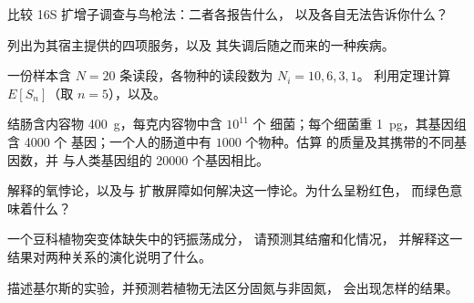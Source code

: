 \begin{exercise}[$\star$]\label{exo:b3:microbiomes:3}
比较 16S 扩增子调查与鸟枪法：二者各报告什么，
以及各自无法告诉你什么？
\end{exercise}

\begin{exercise}[$\star$]\label{exo:b3:microbiomes:4}
列出为其宿主提供的四项服务，以及
其失调后随之而来的一种疾病。
\end{exercise}

\begin{exercise}[$\star\star$]\label{exo:b3:microbiomes:5}
一份样本含 $N = 20$ 条读段，各物种的读段数为 $N_{i} = 10, 6, 3, 1$。
利用定理计算 $E[S_{n}]$（取 $n = 5$），以及。
\end{exercise}

\begin{exercise}[$\star\star$]\label{exo:b3:microbiomes:6}
结肠含内容物 \qty{400}{g}，每克内容物中含 $10^{11}$ 个
细菌；每个细菌重 \qty{1}{pg}，其基因组含 \num{4000} 个
基因；一个人的肠道中有 $1000$ 个物种。估算
的质量及其携带的不同基因数，并
与人类基因组的 \num{20000} 个基因相比。
\end{exercise}

\begin{exercise}[$\star\star$]\label{exo:b3:microbiomes:7}
解释的氧悖论，以及与
扩散屏障如何解决这一悖论。为什么呈粉红色，
而绿色意味着什么？
\end{exercise}

\begin{exercise}[$\star\star$]\label{exo:b3:microbiomes:8}
一个豆科植物突变体缺失中的钙振荡成分，
请预测其结瘤和化情况，
并解释这一结果对两种关系的演化说明了什么。
\end{exercise}

\begin{exercise}[$\star\star$]\label{exo:b3:microbiomes:9}
描述基尔斯的实验，并预测若植物无法区分固氮与非固氮，
会出现怎样的结果。
\end{exercise}

